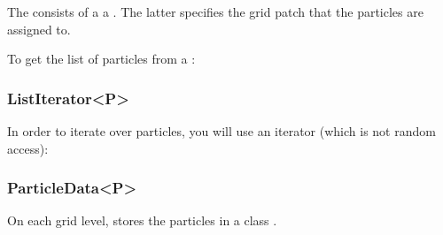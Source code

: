 \documentclass[letterpaper,10pt,english]{sphinxmanual}
\begin{document}
The  consists of a   a .
The latter specifies the grid patch that the particles are assigned to.

To get the list of particles from a :

\begin{sphinxVerbatim}[commandchars=\\\{\},formatcom=\scriptsize]
 

   
\end{sphinxVerbatim}


\subsubsection{ListIterator\textless{}P\textgreater{}}
\label{\detokenize{Source/Particles:listiterator-p}}
In order to iterate over particles, you will use an iterator  (which is not random access):

\begin{sphinxVerbatim}[commandchars=\\\{\},formatcom=\scriptsize]
 
    
      

\end{sphinxVerbatim}


\subsubsection{ParticleData\textless{}P\textgreater{}}
\label{\detokenize{Source/Particles:particledata-p}}
On each grid level,  stores the particles in a  class .
\end{document}
